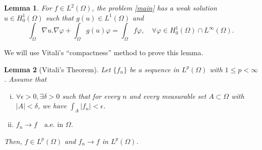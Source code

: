 \documentclass[a4paper, 11pt]{report}
\newtheorem{lmm}{Lemma}[chapter]
\theoremstyle{definition}\newtheorem*{rmk}{Remark}
\begin{document}
\begin{lmm}\label{L2lmm}
For $f \in L^2(\Omega)$, the problem \eqref{main} has a weak solution $u\in H^1_0(\Omega)$ such that $g(u) \in L^1(\Omega )$ and
\[
\int_{\Omega} \nabla u . \nabla \varphi + \int_{\Omega} g(u)\varphi = \int_{\Omega}f\varphi, \quad \forall \varphi \in H^1_0(\Omega)\cap L^{\infty}(\Omega).
\]
\end{lmm}

We will use Vitali's ``compactness'' method to prove this lemma.

\begin{lmm}[Vitali's Theorem]\label{vlmm}
Let $\{f_n\}$ be a sequence in $L^p(\Omega)$ with $1 \le p < \infty$. Assume that
\begin{enumerate}[i)]
\item $\forall \epsilon > 0, \exists \delta > 0$ such that for every $n$ and every measurable set $A \subset \Omega$ with $|A| < \delta$, we have $\int_{A}|f_n| < \epsilon$.
\item $f_n \to f \quad\text{a.e.\ in }\Omega$.
\end{enumerate}
Then, $f \in L^p(\Omega)$ and $f_n \to f$ in $L^p(\Omega)$.
\end{lmm}
\end{document}
